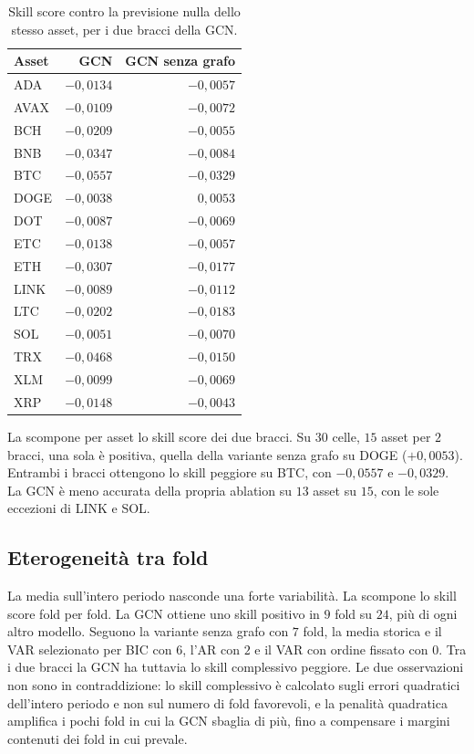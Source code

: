 \begin{table}[H]
\centering
\caption[Skill score per asset]{Skill score contro la previsione nulla dello stesso asset, per i due bracci della GCN.}
\label{tab:tc-skill-by-asset}
\small
\begin{tabular}{@{}lrr@{}}
\toprule
\textbf{Asset} & \textbf{GCN} & \textbf{GCN senza grafo} \\
\midrule
ADA & $-0{,}0134$ & $-0{,}0057$ \\
AVAX & $-0{,}0109$ & $-0{,}0072$ \\
BCH & $-0{,}0209$ & $-0{,}0055$ \\
BNB & $-0{,}0347$ & $-0{,}0084$ \\
BTC & $-0{,}0557$ & $-0{,}0329$ \\
DOGE & $-0{,}0038$ & $0{,}0053$ \\
DOT & $-0{,}0087$ & $-0{,}0069$ \\
ETC & $-0{,}0138$ & $-0{,}0057$ \\
ETH & $-0{,}0307$ & $-0{,}0177$ \\
LINK & $-0{,}0089$ & $-0{,}0112$ \\
LTC & $-0{,}0202$ & $-0{,}0183$ \\
SOL & $-0{,}0051$ & $-0{,}0070$ \\
TRX & $-0{,}0468$ & $-0{,}0150$ \\
XLM & $-0{,}0099$ & $-0{,}0069$ \\
XRP & $-0{,}0148$ & $-0{,}0043$ \\
\bottomrule
\end{tabular}
\end{table}

La  scompone per asset lo skill score dei due bracci. Su $30$ celle, $15$ asset per $2$ bracci, una sola è positiva, quella della variante senza grafo su DOGE ($+0{,}0053$). Entrambi i bracci ottengono lo skill peggiore su BTC, con $-0{,}0557$ e $-0{,}0329$. La GCN è meno accurata della propria ablation su $13$ asset su $15$, con le sole eccezioni di LINK e SOL.

\subsection{Eterogeneità tra fold}

La media sull'intero periodo nasconde una forte variabilità. La  scompone lo skill score fold per fold. La GCN ottiene uno skill positivo in $9$ fold su $24$, più di ogni altro modello. Seguono la variante senza grafo con $7$ fold, la media storica e il VAR selezionato per BIC con $6$, l'AR con $2$ e il VAR con ordine fissato con $0$. Tra i due bracci la GCN ha tuttavia lo skill complessivo peggiore. Le due osservazioni non sono in contraddizione: lo skill complessivo è calcolato sugli errori quadratici dell'intero periodo e non sul numero di fold favorevoli, e la penalità quadratica amplifica i pochi fold in cui la GCN sbaglia di più, fino a compensare i margini contenuti dei fold in cui prevale.

